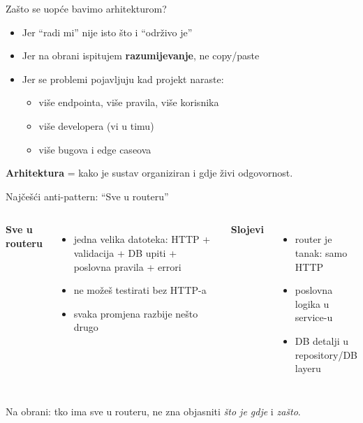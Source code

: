 \begin{frame}{Zašto se uopće bavimo arhitekturom?}
\begin{itemize}
  \item Jer \enquote{radi mi} nije isto što i \enquote{održivo je}
  \item Jer na obrani ispitujem \textbf{razumijevanje}, ne copy/paste
  \item Jer se problemi pojavljuju kad projekt naraste:
  \begin{itemize}
    \item više endpointa, više pravila, više korisnika
    \item više developera (vi u timu)
    \item više bugova i edge caseova
  \end{itemize}
\end{itemize}

\vspace{0.6em}
\textbf{Arhitektura} = kako je sustav organiziran i gdje živi odgovornost.
\end{frame}

\begin{frame}{Najčešći anti-pattern: \enquote{Sve u routeru}}
\begin{columns}[T]
\textbf{Sve u routeru}
\begin{itemize}
  \item jedna velika datoteka: HTTP + validacija + DB upiti + poslovna pravila + errori
  \item ne možeš testirati bez HTTP-a
  \item svaka promjena razbije nešto drugo
\end{itemize}

\textbf{Slojevi}
\begin{itemize}
  \item router je tanak: samo HTTP
  \item poslovna logika u service-u
  \item DB detalji u repository/DB layeru
\end{itemize}
\end{columns}

\vspace{0.8em}
Na obrani: tko ima sve u routeru, ne zna objasniti \emph{što je gdje} i \emph{zašto}.
\end{frame}

